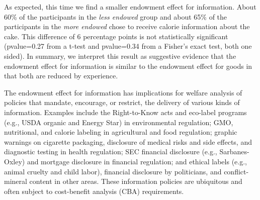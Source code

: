 
As expected, this time we find a smaller endowment effect for information. About 60\% of the participants in the \emph{less endowed} group and about 65\% of the participants in the \emph{more endowed} chose to receive calorie information about the cake. This difference of 6 percentage points is not statistically significant (pvalue=0.27 from a t-test and pvalue=0.34 from a Fisher’s exact test, both one sided). In summary, we interpret this result as suggestive evidence that the endowment effect for information is similar to the endowment effect for goods in that both are reduced by experience.


The endowment effect for information has implications for welfare analysis of policies that mandate, encourage, or restrict, the delivery of various kinds of information. Examples include the Right-to-Know acts and eco-label programs (e.g., USDA organic and Energy Star) in environmental regulation; GMO, nutritional, and calorie labeling in agricultural and food regulation; graphic warnings on cigarette packaging, disclosure of medical risks and side effects, and diagnostic testing in health regulation; SEC financial disclosure (e.g., Sarbanes-Oxley) and mortgage disclosure in financial regulation; and ethical labels (e.g., animal cruelty and child labor), financial disclosure by politicians, and conflict-mineral content in other areas. These information policies are ubiquitous and often subject to cost-benefit analysis (CBA) requirements.

